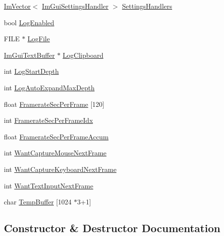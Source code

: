 \begin{DoxyCompactItemize}
\item 
\hyperlink{class_im_vector}{Im\+Vector}$<$ \hyperlink{struct_im_gui_settings_handler}{Im\+Gui\+Settings\+Handler} $>$ \hyperlink{struct_im_gui_context_aded9a2cb80c805407734b8bf7d0ef515}{Settings\+Handlers}
\item 
bool \hyperlink{struct_im_gui_context_a2508bec1862aa4477eca2c79d6924b82}{Log\+Enabled}
\item 
F\+I\+LE $\ast$ \hyperlink{struct_im_gui_context_a73a73a599720fb933e4fb5e673dde131}{Log\+File}
\item 
\hyperlink{struct_im_gui_text_buffer}{Im\+Gui\+Text\+Buffer} $\ast$ \hyperlink{struct_im_gui_context_a676007461d3ce20e50a092573dc05064}{Log\+Clipboard}
\item 
int \hyperlink{struct_im_gui_context_a6ac157821b3a0eb9d0411bc477df8665}{Log\+Start\+Depth}
\item 
int \hyperlink{struct_im_gui_context_a153d8c6eee2acdd3676ca55aec7b1079}{Log\+Auto\+Expand\+Max\+Depth}
\item 
float \hyperlink{struct_im_gui_context_aca772ab262c0094e8bbe7eae215fc23b}{Framerate\+Sec\+Per\+Frame} \mbox{[}120\mbox{]}
\item 
int \hyperlink{struct_im_gui_context_a64a96ad72dd7009dba134f6214a4936e}{Framerate\+Sec\+Per\+Frame\+Idx}
\item 
float \hyperlink{struct_im_gui_context_abcd18f2f8fedf0f45c3148b3e956e653}{Framerate\+Sec\+Per\+Frame\+Accum}
\item 
int \hyperlink{struct_im_gui_context_a7e7a9bbeaac9519abe29818ce6c2cc3b}{Want\+Capture\+Mouse\+Next\+Frame}
\item 
int \hyperlink{struct_im_gui_context_a0372056c72eac8b3e6de06c404caa5b3}{Want\+Capture\+Keyboard\+Next\+Frame}
\item 
int \hyperlink{struct_im_gui_context_abe551d35ea5c1aa61a4d5c785c8e0d9d}{Want\+Text\+Input\+Next\+Frame}
\item 
char \hyperlink{struct_im_gui_context_a875033fc5c10bc1e050f8701055ae93b}{Temp\+Buffer} \mbox{[}1024 $\ast$3+1\mbox{]}
\end{DoxyCompactItemize}


\subsection{Constructor \& Destructor Documentation}
\hypertarget{struct_im_gui_context_a28776600467e31fcc353a8aedec727f1}{}\label{struct_im_gui_context_a28776600467e31fcc353a8aedec727f1} 
